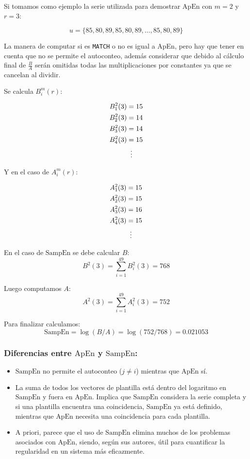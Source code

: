 \documentclass[a4paper,12pt]{article}
\begin{document}
Si tomamos como ejemplo la serie utilizada para demostrar $\textrm{ApEn}$ con $m=2$ y $r=3$:

$$u = \{85, 80, 89, 85, 80, 89, \dots, 85, 80, 89\}$$

La manera de computar si es \texttt{MATCH} o no es igual a \textrm{ApEn}, pero hay que tener en cuenta que no se permite el autoconteo, además considerar que debido al cálculo final de $\frac{B}{A}$ serán omitidas todas las multiplicaciones por constantes ya que se cancelan al dividir.

Se calcula $B_i^m(r)$:

\begin{align*}
   B_1^2(3)&=15 	\\
   B_2^2(3)&=14 	\\
   B_3^2(3)&=14 	\\
   B_4^2(3)&=15 	\\
   & \vdotswithin{=} 		\\
\end{align*}

Y en el caso de $A_i^m(r)$:

\begin{align*}
   A_1^2(3)&=15 	\\
   A_2^2(3)&=15 	\\
   A_3^2(3)&=16 	\\
   A_4^2(3)&=15 	\\
   & \vdotswithin{=} 		\\
\end{align*}

En el caso de $\textrm{SampEn}$ se debe calcular $B$:
$$B^2(3)= \sum_{i=1}^{49} B_i^2(3) = 768$$

Luego computamos $A$:
$$A^2(3)= \sum_{i=1}^{49} A_i^2(3) = 752$$

Para finalizar calculamos:
$$\textrm{SampEn} = \log(B/A) = \log(752/768) = 0.021053$$

\subsubsection{Diferencias entre $\textrm{ApEn}$ y $\textrm{SampEn}$:}
\begin{itemize}[noitemsep, topsep=2pt]
	\item $\textrm{SampEn}$ no permite el autoconteo ($j \neq i$) mientras que $\textrm{ApEn}$ sí. 
	\item La suma de todos los vectores de plantilla está dentro del logaritmo en $\textrm{SampEn}$ y fuera en $\textrm{ApEn}$. Implica que $\textrm{SampEn}$ considera la serie completa y si una plantilla encuentra una coincidencia, $\textrm{SampEn}$ ya está definido, mientras que $\textrm{ApEn}$ necesita una coincidencia para cada plantilla. 
	\item A priori, parece que el uso de $\textrm{SampEn}$ elimina muchos de los problemas asociados con $\textrm{ApEn}$, siendo, según sus autores, útil para cuantificar la regularidad en un sistema más eficazmente.
\end{itemize}
\end{document}
